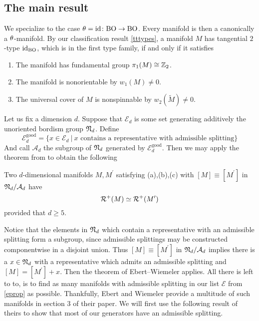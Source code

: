 \subsection{The main result}
We specialize to the case $\theta= \operatorname{id}\colon \mathrm{BO} \to \mathrm{BO}$. 
Every manifold is then a canonically a $\theta$-manifold.
By our classification result \ref{tttypes}, a manifold $M$ has tangential $2$-type $\operatorname{id}_{\mathrm{BO}}$, which is in the first type family, if and only if it satisfies
\begin{enumerate}[label=(\alph*), noitemsep]
    \item The manifold has fundamental group $\pi_1(M) \cong \mathbb{Z}_2$.
    \item The manifold is nonorientable by $w_1(M)\neq 0$.
    \item The universal cover of $M$ is nonspinnable by $w_2(\widetilde{M}) \neq 0$.
\end{enumerate}
Let us fix a dimension $d$.
Suppose that $\mathcal{E}_d$ is some set generating additively the unoriented bordism group $\mathfrak{N}_d$.
Define
\begin{equation*}
    \mathcal{E}_d^{\text{good}} = \{ x \in \mathcal{E}_d \:\vert\: x \text{ contains a representative with admissible splitting}\}
\end{equation*}
And call $\mathcal{A}_d$ the subgroup of $\mathfrak{N}_d$ generated by $\mathcal{E}_d^\text{good}$.
Then we may apply the theorem from \cite{ew:psc} to obtain the following 
\begin{blueprint*}
    \color{themecolordark}
    Two $d$-dimensional manifolds $M,M^\prime$ satisfying (a),(b),(c) with $[M] \equiv [M^\prime]$ in $\mathfrak{N}_d / \mathcal{A}_d$ have
    \begin{equation*}
        \mathcal{R}^+(M) \simeq \mathcal{R}^+(M^\prime)
    \end{equation*}
    provided that $d\geq 5$.
\end{blueprint*}
\prf
Notice that the elements in $\mathfrak{N}_d$ which contain a representative with an admissible splitting form a subgroup, since admissible splittings may be constructed componentwise in a disjoint union.
Thus $[M] \equiv [M^\prime]$ in $\mathfrak{N}_d / \mathcal{A}_d$ implies there is a $x\in\mathfrak{N}_d$ with a representative which admits an admissible splitting and $[M] = [M^\prime] + x$.
Then the theorem of Ebert--Wiemeler applies.
\endprf
All there is left to to, is to find as many manifolds with admissible splitting in our list $\mathcal{E}$ from \ref{eprop} as possible.
Thankfully, Ebert and Wiemeler provide a multitude of such manifolds in section 3 of their paper.
We will first use the following result of theirs to show that most of our generators have an admissible splitting.
